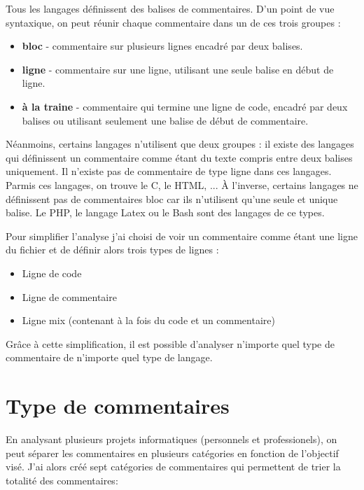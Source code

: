 \documentclass[10pt,a4paper,twoside, openany]{report}
\begin{document}
Tous les langages d\'efinissent des balises de commentaires. D'un point de vue syntaxique, on peut r\'eunir chaque commentaire dans un de ces trois groupes :

\begin{itemize}
\item{\textbf{bloc} - commentaire sur plusieurs lignes encadr\'e par deux balises.}
\item{\textbf{ligne} - commentaire sur une ligne, utilisant une seule balise en d\'ebut de ligne.}
\item{\textbf{\`a la traine} - commentaire qui termine une ligne de code, encadr\'e par deux balises ou utilisant seulement une balise de d\'ebut de commentaire.}
\end{itemize}

N\'eanmoins, certains langages n'utilisent que deux groupes : il existe des langages qui d\'efinissent un commentaire comme \'etant du texte compris entre deux balises uniquement. Il n'existe pas de commentaire de type ligne dans ces langages. Parmis ces langages, on trouve le C, le HTML, ... \`A l'inverse, certains langages ne d\'efinissent pas de commentaires bloc car ils n'utilisent qu'une seule et unique balise. Le PHP, le langage Latex ou le Bash sont des langages de ce types.

Pour simplifier l'analyse j'ai choisi de voir un commentaire comme \'etant une ligne du fichier et de d\'efinir alors trois types de lignes :

\begin{itemize}
\item{Ligne de code}
\item{Ligne de commentaire}
\item{Ligne mix (contenant \`a la fois du code et un commentaire)}
\end{itemize}

Gr\^ace \`a cette simplification, il est possible d'analyser n'importe quel type de commentaire de n'importe quel type de langage.

\section{Type de commentaires}

En analysant plusieurs projets informatiques (personnels et professionels), on peut s\'eparer les commentaires en plusieurs cat\'egories en fonction de l'objectif vis\'e. J'ai alors cr\'e\'e sept cat\'egories de commentaires qui permettent de trier la totalit\'e des commentaires:
\end{document}
